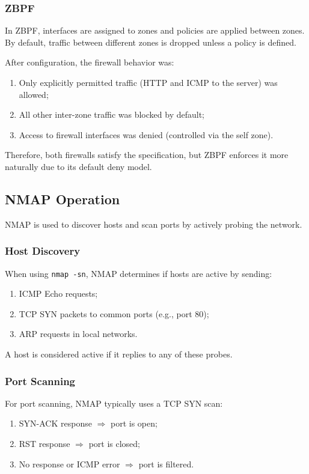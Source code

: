 \documentclass[12pt]{article}
\begin{document}
\subsubsection{ZBPF}

In ZBPF, interfaces are assigned to zones and policies are applied between zones. By default, traffic between different zones is dropped unless a policy is defined.

After configuration, the firewall behavior was:
\begin{enumerate}
    \item Only explicitly permitted traffic (HTTP and ICMP to the server) was allowed;
    \item All other inter-zone traffic was blocked by default;
    \item Access to firewall interfaces was denied (controlled via the self zone).
\end{enumerate}

Therefore, both firewalls satisfy the specification, but ZBPF enforces it more naturally due to its default deny model.

\newpage

\subsection{NMAP Operation}

NMAP is used to discover hosts and scan ports by actively probing the network.

\subsubsection{Host Discovery}

When using \texttt{nmap -sn}, NMAP determines if hosts are active by sending:
\begin{enumerate}
    \item ICMP Echo requests;
    \item TCP SYN packets to common ports (e.g., port 80);
    \item ARP requests in local networks.
\end{enumerate}

A host is considered active if it replies to any of these probes.

\subsubsection{Port Scanning}

For port scanning, NMAP typically uses a TCP SYN scan:
\begin{enumerate}
    \item SYN-ACK response $\Rightarrow$ port is open;
    \item RST response $\Rightarrow$ port is closed;
    \item No response or ICMP error $\Rightarrow$ port is filtered.
\end{enumerate}
\end{document}
